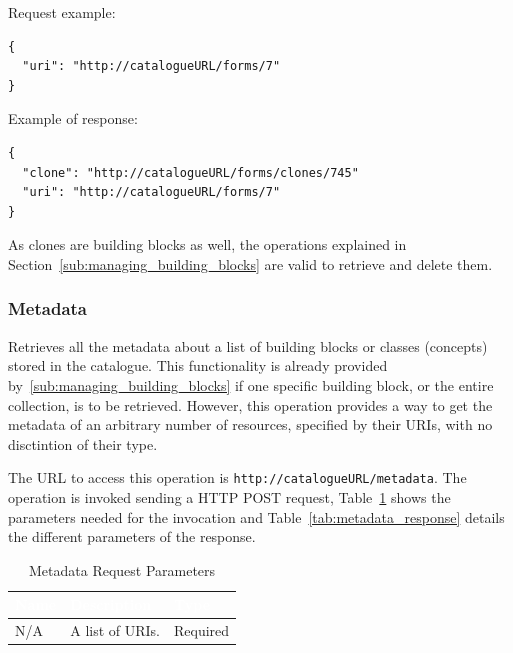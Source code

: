 \documentclass{fast_latex}
\begin{document}
Request example:

\singlespacing
\begin{verbatim}
{
  "uri": "http://catalogueURL/forms/7"
}
\end{verbatim}
\doublespacing

Example of response:

\singlespacing
\begin{verbatim}
{
  "clone": "http://catalogueURL/forms/clones/745"
  "uri": "http://catalogueURL/forms/7"
}
\end{verbatim}
\doublespacing

As clones are building blocks as well, the operations explained in Section~\ref{sub:managing_building_blocks} are valid to retrieve and delete them.


\subsubsection{Metadata} %
\label{ssub:metadata}

Retrieves all the metadata about a list of building blocks or classes (concepts) stored in the catalogue. This functionality is already provided by~\ref{sub:managing_building_blocks} if one specific building block, or the entire collection, is to be retrieved. However, this operation provides a way to get the metadata of an arbitrary number of resources, specified by their URIs, with no disctintion of their type.

The URL to access this operation is \verb|http://catalogueURL/metadata|. The operation is invoked sending a HTTP POST request, Table~\ref{tab:metadata_request} shows the parameters needed for the invocation and Table~\ref{tab:metadata_response} details the different parameters of the response.

\begin{table}[htb!]
\caption{Metadata Request Parameters}
\label{tab:metadata_request}
\begin{center}
\begin{tabular}{|p{2.5cm}|p{9cm}|p{2cm}|}
\hline
\rowcolor{fast@lightgrey}\textcolor{white}{Name} &
                         \textcolor{white}{Description} &
                         \textcolor{white}{Type}\\ \hline
N/A & A list of URIs. & Required\\ \hline
\end{tabular}
\end{center}
\end{table}
\end{document}
